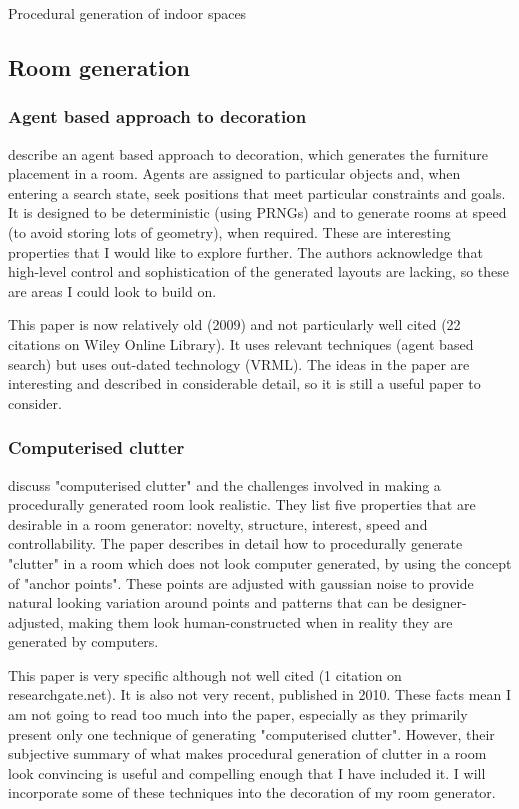 \documentclass[review]{cmpreport}
\begin{document}
\begin{section}{Procedural generation of indoor spaces}

\subsection{Room generation}
\subsubsection{Agent based approach to decoration}
\cite{doi:10.1111/j.1467-8659.2009.01351.x} describe an agent based approach to decoration, which generates the furniture placement in a room. Agents are assigned to particular objects and, when entering a search state, seek positions that meet particular constraints and goals. It is designed to be deterministic (using PRNGs) and to generate rooms at speed (to avoid storing lots of geometry), when required. These are interesting properties that I would like to explore
further. The authors acknowledge that high-level control and sophistication of the generated layouts are lacking, so these are areas I could look to build on. \par
This paper is now relatively old (2009) and not particularly well cited (22 citations
on Wiley Online Library). It uses relevant techniques (agent based search) but uses
out-dated technology (VRML). The ideas in the paper are interesting and described in
considerable detail, so it is still a useful paper to consider. 

\subsubsection{Computerised clutter}
\cite{taylor-parberry} discuss "computerised clutter" and the challenges involved in making a procedurally generated room look realistic. They list five properties that are desirable in a room generator: novelty, structure, interest, speed and controllability. The paper describes in detail how to procedurally generate "clutter" in a room which does not look computer generated, by using the concept of "anchor points". These points are adjusted with gaussian noise to provide natural looking variation around points and patterns that can be designer-adjusted, making them look human-constructed when in reality they are generated by computers.\par
This paper is very specific although not well cited (1 citation on researchgate.net). It is also not very recent, published in 2010. These facts mean I am not going to read too much into the paper, especially as they primarily present only one technique of generating "computerised clutter". However, their subjective summary of what makes procedural generation of clutter in a room look convincing is useful and compelling enough that I have included it. I will incorporate some of these techniques into the decoration of my room generator.


\end{section}
\end{document}
